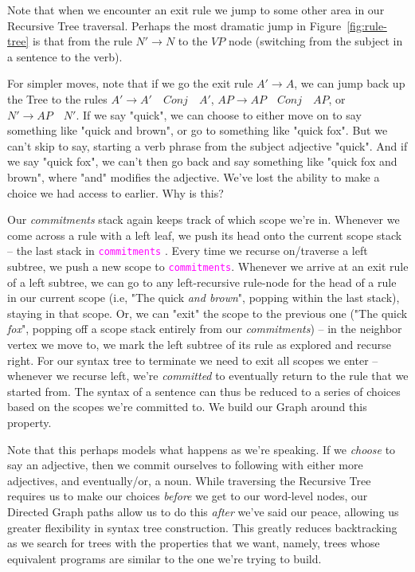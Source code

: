 \documentclass[runningheads]{llncs}
\newcommand{\code}[1]{\texttt{\textcolor{magenta}{\setlength{\fboxsep}{1pt}\colorbox{lightgray!20}{#1}}}}
\begin{document}
Note that when we encounter an exit rule we jump to some other area in our Recursive Tree traversal. Perhaps the most dramatic jump in Figure~\ref{fig:rule-tree} is that from the rule \mbox{$N' \rightarrow N$} to the $VP$ node (switching from the subject in a sentence to the verb).

For simpler moves, note that if we go the exit rule $A' \rightarrow  A$, we can jump back up the Tree to the rules \mbox{$A' \rightarrow A' \quad Conj \quad A'$}, \mbox{$AP \rightarrow AP \quad Conj \quad AP$}, or \mbox{$N' \rightarrow AP \quad N'$}. If we say "quick", we can choose to either move on to say something like "quick and brown", or go to something like "quick fox". But we can't skip to say, starting a verb phrase from the subject adjective "quick". And if we say "quick fox", we can't then go back and say something like "quick fox and brown", where "and" modifies the adjective. We've lost the ability to make a choice we had access to earlier. Why is this?

Our \textit{commitments} stack again keeps track of which scope we're in. Whenever we come across a rule with a left leaf, we push its head onto the current scope stack --  the last stack in \code{commitments} . Every time we recurse on/traverse a left subtree, we push a new scope to \code{commitments}. Whenever we arrive at an exit rule of a left subtree, we can go to any left-recursive rule-node for the head of a rule in our current scope (i.e, "The quick \textit{and brown}", popping within the last stack), staying in that scope. Or, we can "exit" the scope to the previous one ("The quick \textit{fox}", popping off a scope stack entirely from our \textit{commitments}) -- in the neighbor vertex we move to, we mark the left subtree of its rule as explored and recurse right. For our syntax tree to terminate we need to exit all scopes we enter -- whenever we recurse left, we're \textit{committed} to eventually return to the rule that we started from. The syntax of a sentence can thus be reduced to a series of choices based on the scopes we're committed to. We build our Graph around this property.

Note that this perhaps models what happens as we're speaking. If we \textit{choose} to say an adjective, then we commit ourselves to following with either more adjectives, and eventually/or, a noun. While traversing the Recursive Tree requires us to make our choices \textit{before} we get to our word-level nodes, our Directed Graph paths allow us to do this \textit{after} we've said our peace, allowing us greater flexibility in syntax tree construction. This greatly reduces backtracking as we search for trees with the properties that we want, namely, trees whose equivalent programs are similar to the one we're trying to build.
\end{document}
